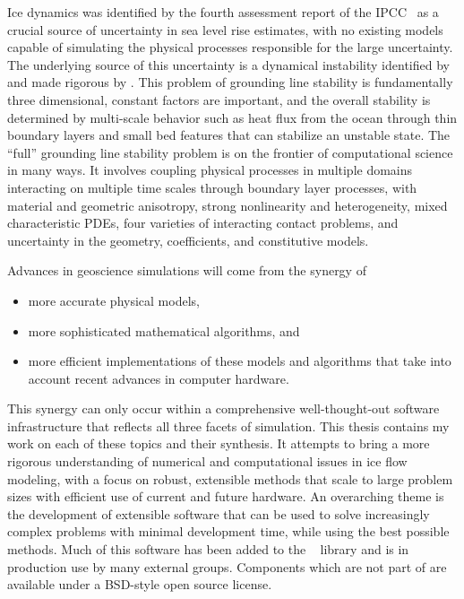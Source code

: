 Ice dynamics was identified by the fourth assessment report of the IPCC~\citep{lemk2007ar4wg1} as a crucial source of uncertainty in sea level rise estimates, with no existing models capable of simulating the physical processes responsible for the large uncertainty.
The underlying source of this uncertainty is a dynamical instability identified by \citet{weertman1974sji} and made rigorous by \citet{schoof2007isg}.
This problem of grounding line stability is fundamentally three dimensional, constant factors are important, and the overall stability is determined by multi-scale behavior such as heat flux from the ocean through thin boundary layers and small bed features that can stabilize an unstable state.
The ``full'' grounding line stability problem is on the frontier of computational science in many ways.
It involves coupling physical processes in multiple domains interacting on multiple time scales through boundary layer processes, with material and geometric anisotropy, strong nonlinearity and heterogeneity, mixed characteristic PDEs, four varieties of interacting contact problems, and uncertainty in the geometry, coefficients, and constitutive models.

Advances in geoscience simulations will come from the synergy of
\begin{itemize}
\item more accurate physical models,
\item more sophisticated mathematical algorithms, and
\item more efficient implementations of these models and algorithms that take into account recent advances in computer hardware.
\end{itemize}
This synergy can only occur within a comprehensive well-thought-out software infrastructure that reflects all three facets of simulation.
This thesis contains my work on each of these topics and their synthesis.
It attempts to bring a more rigorous understanding of numerical and computational issues in ice flow modeling, with a focus on robust, extensible methods that scale to large problem sizes with efficient use of current and future hardware.
An overarching theme is the development of extensible software that can be used to solve increasingly complex problems with minimal development time, while using the best possible methods.
Much of this software has been added to the {\PETSc}~\citep{petsc-user-ref} library and is in production use by many external groups.
Components which are not part of {\PETSc} are available under a BSD-style open source license.

